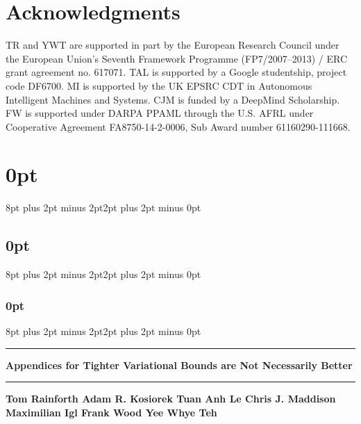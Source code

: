 \documentclass{article}
\begin{document}
\clearpage

\section*{Acknowledgments}

TR and YWT are supported in part by the European Research Council under the European Union's Seventh Framework Programme (FP7/2007--2013) / ERC grant agreement no. 617071. 
TAL is supported by a Google studentship, project code DF6700.
MI is supported by the UK EPSRC CDT in Autonomous Intelligent Machines
and Systems.
CJM is funded by a DeepMind Scholarship.
FW is supported under DARPA PPAML through the U.S. AFRL
under Cooperative Agreement FA8750-14-2-0006, Sub Award number 61160290-111668.




\clearpage

\appendix
	\onecolumn
\setlength{\abovedisplayskip}{5pt}
\setlength{\belowdisplayskip}{5pt}
\setlength{\abovedisplayshortskip}{5pt}
\setlength{\belowdisplayshortskip}{5pt}

\titlespacing\section{0pt}{8pt plus 2pt minus 2pt}{2pt plus 2pt minus 0pt}
\titlespacing\subsection{0pt}{8pt plus 2pt minus 2pt}{2pt plus 2pt minus 0pt}
\titlespacing\subsubsection{0pt}{8pt plus 2pt minus 2pt}{2pt plus 2pt minus 0pt}

\thispagestyle{empty} 
\rule{\textwidth}{1pt}
\vspace{-6pt}
\begin{center}
	\textbf{ \Large  Appendices for Tighter Variational Bounds are Not Necessarily
		Better}
\end{center}%
\rule{\textwidth}{1pt}

	\begin{minipage}{\textwidth}
		\centering
		\vspace{17pt}
		\textbf{Tom Rainforth \quad Adam R. Kosiorek \quad Tuan Anh Le \quad Chris J. Maddison \\
		 Maximilian Igl \quad Frank Wood \quad Yee Whye Teh}
		\vspace{6pt}
	\end{minipage}







%
%
\end{document}
